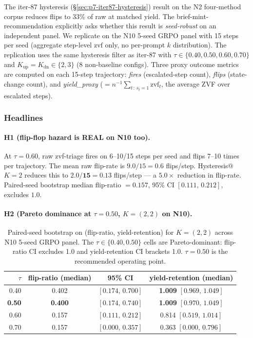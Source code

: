 \documentclass{article}
\begin{document}
The iter-87 hysteresis (\S\ref{sec:p7-iter87-hysteresis}) result on the
N2 four-method corpus reduces flips to 33\% of raw at matched yield. The
brief-mint-recommendation explicitly asks whether this result is
\emph{seed-robust} on an independent panel. We replicate on the N10
5-seed GRPO panel with 15 steps per seed (aggregate step-level $\mathrm{zvf}$
only, no per-prompt $k$ distribution). The replication uses the same
hysteresis filter as iter-87 with $\tau \in \{0.40, 0.50, 0.60, 0.70\}$
and $K_\text{up} = K_\text{dn} \in \{2, 3\}$ (8 non-baseline configs).
Three proxy outcome metrics are computed on each 15-step trajectory:
\emph{fires} (escalated-step count), \emph{flips} (state-change count),
and \emph{yield\_proxy} ($= n^{-1} \sum_{t\,:\,s_t=1} \mathrm{zvf}_t$,
the average ZVF over escalated steps).

\subsubsection{Headlines}

\paragraph{H1 (flip-flop hazard is REAL on N10 too).}
At $\tau = 0.60$, raw zvf-triage fires on 6--10/15 steps per seed and flips
7--10 times per trajectory. The mean raw flip-rate is
$9.0/15 = 0.6$ flips/step. Hysteresis@$K{=}2$ reduces this to
$\mathbf{2.0/15 = 0.13}$ flips/step — a $\mathbf{5.0\times}$ reduction
in flip-rate. Paired-seed bootstrap median flip-ratio $\mathbf{= 0.157}$,
95\% CI $[0.111,\, 0.212]$, excludes $1.0$.

\paragraph{H2 (Pareto dominance at $\tau = 0.50$, $K = (2,2)$ on N10).}

\begin{table}[h]
\centering
\small
\begin{tabular}{rccc}
\toprule
$\tau$ & flip-ratio (median) & 95\% CI & yield-retention (median) \\
\midrule
0.40 & 0.402 & $[0.174,\, 0.700]$ & \textbf{1.009} $[0.969,\, 1.049]$ \\
\textbf{0.50} & \textbf{0.400} & $\mathbf{[0.174,\, 0.740]}$ & \textbf{1.009} $[0.970,\, 1.049]$ \\
0.60 & 0.157 & $[0.111,\, 0.212]$ & 0.814 $[0.519,\, 1.014]$ \\
0.70 & 0.157 & $[0.000,\, 0.357]$ & 0.363 $[0.000,\, 0.796]$ \\
\bottomrule
\end{tabular}
\caption{Paired-seed bootstrap on (flip-ratio, yield-retention) for
$K=(2,2)$ across N10 5-seed GRPO panel. The $\tau \in \{0.40, 0.50\}$
cells are Pareto-dominant: flip-ratio CI excludes 1.0 and yield-retention
CI brackets 1.0. $\tau = 0.50$ is the recommended operating point.}
\label{tab:p7-hyst-n10}
\end{table}
\end{document}
